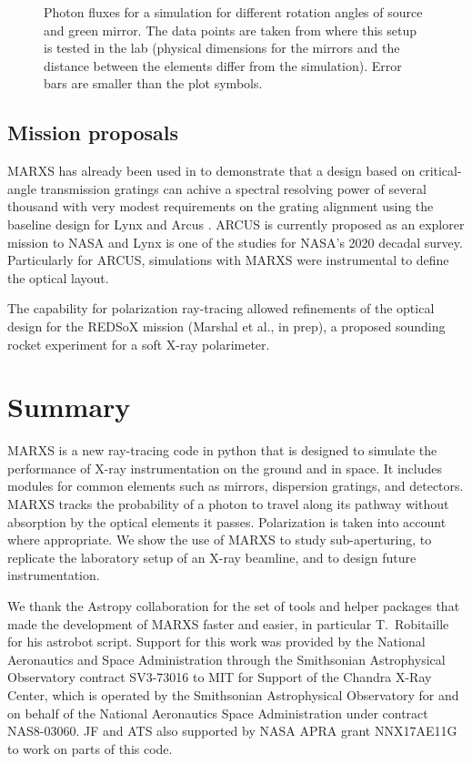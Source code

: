 \documentclass[twocolumn]{aastex61}
\begin{document}
\begin{figure}[ht!]
\caption{Photon fluxes for a simulation for different rotation angles of
source and green mirror. The data points are taken from \citet{2013SPIE.8861E..1DM} where this setup is tested in the lab (physical dimensions for the mirrors and the distance between the elements differ from the simulation). Error bars are smaller than the plot symbols.}
    \label{fig:polcurve}
\end{figure}



\subsection{Mission proposals}
\label{sect:use}
MARXS has already been used in \citet{2016SPIE.9905E..56G} to
demonstrate that a design based on critical-angle transmission
gratings \citep{doi:10.1117/12.2188525} can achive a spectral
resolving power of several thousand with very modest requirements on
the grating alignment using the baseline design for Lynx
\citep{doi:10.1117/12.2190837} and Arcus
\citep{doi:10.1117/12.2062671}. ARCUS is currently proposed as an
explorer mission to NASA and Lynx is one of the studies for NASA's 2020
decadal survey. Particularly for ARCUS, simulations with MARXS were
instrumental to define the optical layout.

The capability for polarization ray-tracing allowed refinements of the
optical design for the REDSoX mission (Marshal et al., in prep), a
proposed sounding rocket experiment for a soft X-ray polarimeter.


\section{Summary}
\label{sect:summary}
MARXS is a new ray-tracing code in python that is designed to simulate the
performance of X-ray instrumentation on the ground and in space. It includes
modules for common elements such as mirrors, dispersion gratings, and
detectors. MARXS tracks the probability of a photon to travel along its
pathway without absorption by the optical elements it passes. Polarization is
taken into account where appropriate. We show the use of MARXS to study
sub-aperturing, to replicate the laboratory setup of an X-ray beamline, and to
design future instrumentation.

\acknowledgments 
We thank the Astropy collaboration for the set of tools and
helper packages that made the development of MARXS faster and easier, in
particular T.\ Robitaille for his astrobot script. Support for this work was
provided by the National Aeronautics and Space Administration through the
Smithsonian Astrophysical Observatory contract SV3-73016 to MIT for Support of
the Chandra X-Ray Center, which is operated by the Smithsonian Astrophysical
Observatory for and on behalf of the National Aeronautics Space Administration
under contract NAS8-03060. JF and ATS also supported by NASA APRA
grant NNX17AE11G to work on parts of this code.
\end{document}
